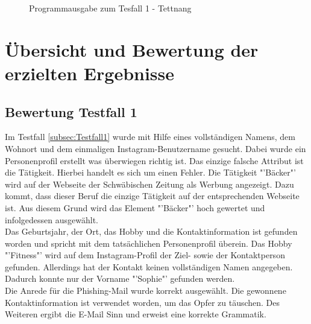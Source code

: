 			\begin{figure}[h!]
				\caption{Programmausgabe zum Tesfall 1 - Tettnang}
			\end{figure}
			\FloatBarrier
			
\section{Übersicht und Bewertung der erzielten Ergebnisse}
	\subsection{Bewertung Testfall 1}
	Im Testfall \ref{subsec:Testfall1} wurde mit Hilfe eines vollständigen Namens, dem Wohnort und dem einmaligen Instagram-Benutzername gesucht. Dabei wurde ein Personenprofil erstellt was überwiegen richtig ist. Das einzige falsche Attribut ist die Tätigkeit. Hierbei handelt es sich um einen Fehler. Die Tätigkeit "'Bäcker"' wird auf der Webseite der Schwäbischen Zeitung als Werbung angezeigt. Dazu kommt, dass dieser Beruf die einzige Tätigkeit auf der entsprechenden Webseite ist. Aus diesem Grund wird das Element "'Bäcker"' hoch gewertet und infolgedessen ausgewählt.\\
	Das Geburtsjahr, der Ort, das Hobby und die Kontaktinformation ist gefunden worden und spricht mit dem tatsächlichen Personenprofil überein. Das Hobby "'Fitness"' wird auf dem Instagram-Profil der Ziel- sowie der Kontaktperson gefunden. Allerdings hat der Kontakt keinen vollständigen Namen angegeben. Dadurch konnte nur der Vorname "'Sophie"' gefunden werden.\\
	Die Anrede für die Phishing-Mail wurde korrekt ausgewählt. Die gewonnene Kontaktinformation ist verwendet worden, um das Opfer zu täuschen. Des Weiteren ergibt die E-Mail Sinn und erweist eine korrekte Grammatik. 
